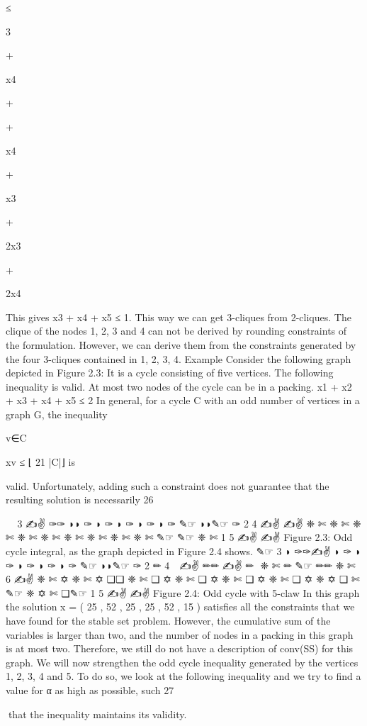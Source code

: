 \documentclass[titlepage]{book}
\theoremstyle{definition}
\begin{document}
≤

3

+

x4

+

+

x4

+

x3

+

2x3

+

2x4

This gives x3 + x4 + x5 ≤ 1. This way we can get 3-cliques from 2-cliques. The clique of the nodes 1,
2, 3 and 4 can not be derived by rounding constraints of the formulation. However, we can derive them
from the constraints generated by the four 3-cliques contained in {1, 2, 3, 4}.
Example
Consider the following graph depicted in Figure 2.3: It is a cycle consisting of five vertices.
The following inequality is valid. At most two nodes of the cycle can be in a packing.
x1 + x2 + x3 + x4 + x5 ≤ 2
In general, for a cycle C with an odd number of vertices in a graph G, the inequality

v∈C

xv ≤ ⌊ 21 |C|⌋ is

valid. Unfortunately, adding such a constraint does not guarantee that the resulting solution is necessarily
26

✎☞
3
✍✌
✑✑ ◗◗
✑
◗
✑
◗
✑
◗
✑
◗
✑
✎☞
◗◗✎☞
✑
2
4
✍✌
✍✌
❈
✄
❈
✄
❈
✄
❈
✄
❈
✄
❈
✄
❈
✄
❈
✄
❈
✄
✎☞
✎☞
❈
✄
1
5
✍✌
✍✌
Figure 2.3: Odd cycle
integral, as the graph depicted in Figure 2.4 shows.
✎☞
3
◗
✑✑✍✌
◗
✑
◗
✑
◗
✑
◗
✑
◗
✑
✎☞
◗◗✎☞
✑
2
✏ 4


✍✌
✏✏ ✍✌
✏

❈
✄
✏
✎☞
✏✏
❈
✄
6
✍✌
❈
✄
✡
❈
✄
✡ ❏❏
❈
✄
❏
✡
❈
✄
❏
✡
❈
✄
❏
✡
❈
✄
❏
✡
❈ ✡
❏ ✄
✎☞
❈ ✡
✄
❏✎☞
1
5
✍✌
✍✌
Figure 2.4: Odd cycle with 5-claw
In this graph the solution x = ( 25 , 52 , 25 , 25 , 52 , 15 ) satisfies all the constraints that we have found for the
stable set problem. However, the cumulative sum of the variables is larger than two, and the number of
nodes in a packing in this graph is at most two. Therefore, we still do not have a description of conv(SS)
for this graph. We will now strengthen the odd cycle inequality generated by the vertices 1, 2, 3, 4 and
5. To do so, we look at the following inequality and we try to find a value for α as high as possible, such
27

that the inequality maintains its validity.
\end{document}
